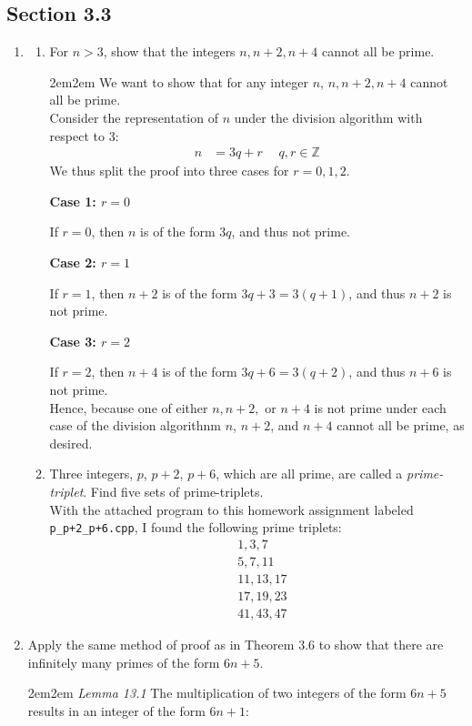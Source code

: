 \documentclass[10pt,oneside]{book}
\newcommand{\Z}{\mathbb{Z}}\newcommand{\R}{\mathbb{R}}\newcommand{\N}{\mathbb{N}}
\newcommand{\gspc}{\vspace{0.13cm}} %
\newcommand{\gline}{\gspc\\} %
\newcommand{\centerit}[1]{{\begin{center} #1 \end{center}}}
\let\endoldproof\endproof
\renewenvironment{proof}[1][\proofname]
  {\vspace{0.2cm}\begin{adjustwidth}{2em}{2em}
   \oldproof[#1]}
  {\endoldproof
\end{adjustwidth}}
\begin{document}
\subsection*{Section 3.3}
\begin{enumerate}
	\item [9.]\begin{enumerate}
		\item For $n > 3$, show that the integers $n, n + 2, n + 4$ cannot all be prime.
		\begin{proof}
			We want to show that for any integer $n$, $n, n + 2, n + 4$ cannot all be prime.\gline
			Consider the representation of $n$ under the division algorithm with respect to $3$:
			\begin{align*}
				n &= 3q + r\quad \;q,r\in\Z
			\end{align*}
			We thus split the proof into three cases for $r=0,1,2$.
			\centerit{\textbf{Case 1: $r = 0$}}
			If $r = 0$, then $n$ is of the form $3q$, and thus not prime.
			\centerit{\textbf{Case 2: $r = 1$}}
			If $r = 1$, then $n + 2$ is of the form $3q + 3 = 3(q + 1)$, and thus $n + 2$ is not prime.
			\centerit{\textbf{Case 3: $r = 2$}}
			If $r = 2$, then $n + 4$ is of the form $3q + 6 = 3(q + 2)$, and thus $n + 6$ is not prime.\gline
			Hence, because one of either $n, n+2,$ or $n+4$ is not prime under each case of the division algorithnm $n$, $n+2$, and $n+4$ cannot all be prime, as desired. 
		\end{proof}
		\item Three integers, $p$, $p+2$, $p+6$, which are all prime, are called a \textit{prime-triplet}. Find five sets of prime-triplets. \gline
		With the attached program to this homework assignment labeled \texttt{p\_p+2\_p+6.cpp}, I found the following prime triplets:
		\begin{align*}
			&1, 3, 7\\
			&5, 7, 11\\
			&11, 13, 17\\
			&17, 19, 23\\
			&41, 43, 47
		\end{align*}
	\end{enumerate}
	\pagebreak
	\item [13.] Apply the same method of proof as in Theorem 3.6 to show that there are infinitely many primes of the form $6n + 5$.
	\begin{adjustwidth}{2em}{2em}
		\textit{Lemma 13.1} The multiplication of two integers of the form $6n+5$ results in an integer of the form $6n+1$:
		\begin{align*}

\end{align*}
\end{adjustwidth}
\end{enumerate}
\end{document}

